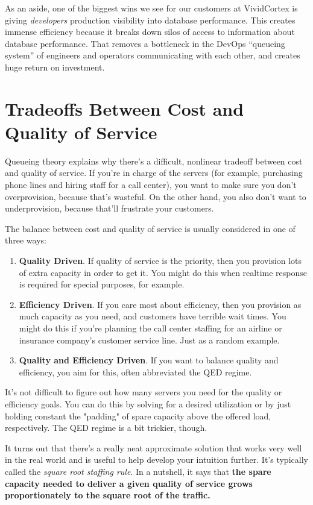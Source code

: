 \documentclass{vivid_layout}
\begin{document}
As an aside, one of the biggest wins we see for our customers at VividCortex is giving {\itshape developers} production visibility into database performance. This creates immense efficiency because it breaks down silos of access to information about database performance. That removes a bottleneck in the DevOps ``queueing system'' of engineers and operators communicating with each other, and creates huge return on investment.

\section{Tradeoffs Between Cost and Quality of Service}

Queueing theory explains why there's a difficult, nonlinear tradeoff between
cost and quality of service. If you're in charge of the servers (for example,
purchasing phone lines and hiring staff for a call center), you want to make
sure you don't overprovision, because that's wasteful. On the other hand, you
also don't want to underprovision, because that'll frustrate your customers.

The balance between cost and quality of service is usually considered in one of
three ways:

\begin{enumerate}
\item {\bfseries Quality Driven}. If quality of service is the priority, then
you provision lots of extra capacity in order to get it. You might do this when
realtime response is required for special purposes, for example.
\item {\bfseries Efficiency Driven}. If you care most about efficiency, then you
provision as much capacity as you need, and customers have terrible wait times.
You might do this if you're planning the call center staffing for an airline or
insurance company's customer service line. Just as a random example.
\item {\bfseries Quality and Efficiency Driven}. If you want to balance quality
and efficiency, you aim for this, often abbreviated the QED regime.
\end{enumerate}

It's not difficult to figure out how many servers you need for the quality or
efficiency goals. You can do this by solving for a desired utilization or by
just holding constant the "padding" of spare capacity above the offered load,
respectively. The QED regime is a bit trickier, though.

It turns out that there's a really neat approximate solution that works very
well in the real world and is useful to help develop your intuition further.
It's typically called the {\itshape square root staffing rule}. In a nutshell,
it says that {\bfseries the spare capacity needed to deliver a given quality of
service grows proportionately to the square root of the traffic.}
\end{document}
